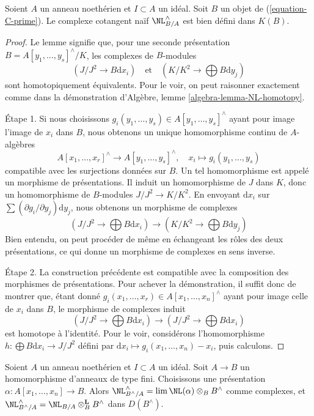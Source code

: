 \begin{lemma}
\label{lemma-NL-up-to-homotopy}
Soient $A$ un anneau noethérien et $I \subset A$ un idéal. Soit $B$ un objet
de (\ref{equation-C-prime}). Le complexe cotangent naïf
$\NL_{B/A}^\wedge$ est bien défini dans $K(B)$.
\end{lemma}

\begin{proof}
Le lemme signifie que, pour une seconde présentation
$B = A[y_1, \ldots, y_s]^\wedge / K$, les complexes de $B$-modules
$$
(J/J^2 \to B\text{d}x_i)
\quad\text{et}\quad
(K/K^2 \to \bigoplus B\text{d}y_j)
$$
sont homotopiquement équivalents. Pour le voir, on peut raisonner exactement
comme dans la démonstration d'Algèbre, lemme
\ref{algebra-lemma-NL-homotopy}.

\medskip\noindent
Étape 1. Si nous choisissons
$g_i(y_1, \ldots, y_s) \in A[y_1, \ldots, y_s]^\wedge$ ayant pour image
l'image de $x_i$ dans $B$, nous obtenons un unique homomorphisme continu de
$A$-algèbres
$$
A[x_1, \ldots, x_r]^\wedge \to A[y_1, \ldots, y_s]^\wedge,\quad
x_i \mapsto g_i(y_1, \ldots, y_s)
$$
compatible avec les surjections données sur $B$. Un tel homomorphisme est
appelé un morphisme de présentations. Il induit un homomorphisme de $J$ dans
$K$, donc un homomorphisme de $B$-modules $J/J^2 \to K/K^2$. En envoyant
$\text{d}x_i$ sur $\sum (\partial g_i/\partial y_j)\text{d}y_j$, nous
obtenons un morphisme de complexes
$$
(J/J^2 \to \bigoplus B\text{d}x_i)
\longrightarrow
(K/K^2 \to \bigoplus B\text{d}y_j)
$$
Bien entendu, on peut procéder de même en échangeant les rôles des deux
présentations, ce qui donne un morphisme de complexes en sens inverse.

\medskip\noindent
Étape 2. La construction précédente est compatible avec la composition des
morphismes de présentations. Pour achever la démonstration, il suffit donc de
montrer que, étant donné
$g_i(x_1, \ldots, x_r) \in A[x_1, \ldots, x_n]^\wedge$
ayant pour image celle de $x_i$ dans $B$, le morphisme de complexes induit
$$
(J/J^2 \to \bigoplus B\text{d}x_i)
\longrightarrow
(J/J^2 \to \bigoplus B\text{d}x_i)
$$
est homotope à l'identité. Pour le voir, considérons l'homomorphisme
$h : \bigoplus B \text{d}x_i \to J/J^2$ défini par
$\text{d}x_i \mapsto g_i(x_1, \ldots, x_n) - x_i$, puis calculons.
\end{proof}

\begin{lemma}
\label{lemma-NL-is-completion}
Soient $A$ un anneau noethérien et $I \subset A$ un idéal. Soit
$A \to B$ un homomorphisme d'anneaux de type fini. Choisissons une
présentation $\alpha : A[x_1, \ldots, x_n] \to B$. Alors
$\NL_{B^\wedge/A}^\wedge = \lim \NL(\alpha) \otimes_B B^\wedge$
comme complexes, et
$\NL_{B^\wedge/A}^\wedge = \NL_{B/A} \otimes_B^\mathbf{L} B^\wedge$
dans $D(B^\wedge)$.
\end{lemma}

